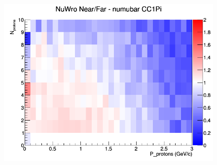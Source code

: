 \begin{figure}[h]
\endminipage
{}
\includegraphics[width=\linewidth]{N_P/nominal/protons/ratios/CC1Pi_NuWro_numubar_NF_N_P.png}
\endminipage
\newline
\end{figure}
\clearpage
